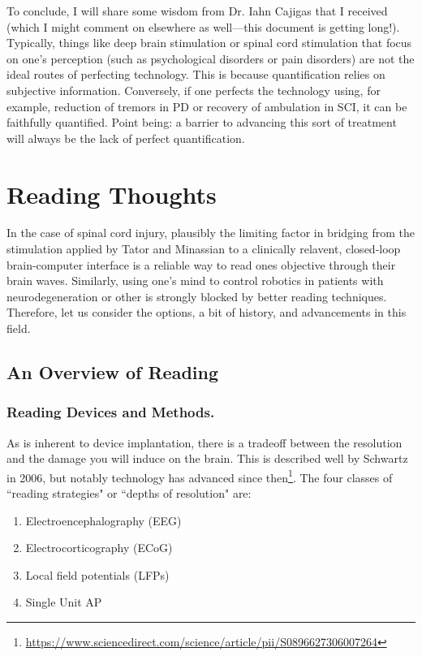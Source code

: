 To conclude, I will share some wisdom from Dr. Iahn Cajigas that I received (which I might comment on elsewhere as well---this document is getting long!). Typically, things like deep brain stimulation or spinal cord stimulation that focus on one's perception (such as psychological disorders or pain disorders) are not the ideal routes of perfecting technology. This is because quantification relies on subjective information. Conversely, if one perfects the technology using, for example, reduction of tremors in PD or recovery of ambulation in SCI, it can be faithfully quantified. Point being: a barrier to advancing this sort of treatment will always be the lack of perfect quantification. 






\chapter{Reading Thoughts} 

In the case of spinal cord injury, plausibly the limiting factor in bridging from the stimulation applied by Tator and Minassian to a clinically relavent, closed-loop brain-computer interface is a reliable way to read ones objective through their brain waves. Similarly, using one's mind to control robotics in patients with neurodegeneration or other is strongly blocked by better reading techniques. Therefore, let us consider the options, a bit of history, and advancements in this field.

\section{An Overview of Reading} 

\subsection{Reading Devices and Methods.}

As is inherent to device implantation, there is a tradeoff between the resolution and the damage you will induce on the brain. This is described well by Schwartz in 2006, but notably technology has advanced since then\footnote{\url{https://www.sciencedirect.com/science/article/pii/S0896627306007264}}. The four classes of ``reading strategies" or ``depths of resolution" are: 
\begin{enumerate}
    \itemsep 0em
    \item Electroencephalography (EEG)
    \item Electrocorticography (ECoG)
    \item Local field potentials (LFPs)
    \item Single Unit AP
\end{enumerate}

